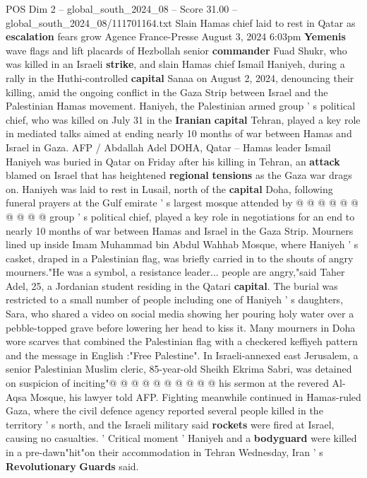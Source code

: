 \begin{textsample}{POS Dim 2 – global\_south\_2024\_08 – Score 31.00 – global\_south\_2024\_08/111701164.txt}  \label{ex:f2_pos_010}
Slain Hamas chief laid to rest in Qatar as \textbf{escalation} fears grow Agence France-Presse August 3, 2024 6:03pm \textbf{Yemenis} wave flags and lift placards of Hezbollah senior \textbf{commander} Fuad Shukr, who was killed in an Israeli \textbf{strike}, and slain Hamas chief Ismail Haniyeh, during a rally in the Huthi-controlled \textbf{capital} Sanaa on August 2, 2024, denouncing their killing, amid the ongoing conflict in the Gaza Strip between Israel and the Palestinian Hamas movement.
Haniyeh, the Palestinian armed group ' s political chief, who was killed on July 31 in the \textbf{Iranian} \textbf{capital} Tehran, played a key role in mediated talks aimed at ending nearly 10 months of war between Hamas and Israel in Gaza.
AFP / Abdallah Adel DOHA, Qatar -- Hamas leader Ismail Haniyeh was buried in Qatar on Friday after his killing in Tehran, an \textbf{attack} blamed on Israel that has heightened \textbf{regional} \textbf{tensions} as the Gaza war drags on.
Haniyeh was laid to rest in Lusail, north of the \textbf{capital} Doha, following funeral prayers at the Gulf emirate ' s largest mosque attended by @ @ @ @ @ @ @ @ @ @ group ' s political chief, played a key role in negotiations for an end to nearly 10 months of war between Hamas and Israel in the Gaza Strip.
Mourners lined up inside Imam Muhammad bin Abdul Wahhab Mosque, where Haniyeh ' s casket, draped in a Palestinian flag, was briefly carried in to the shouts of angry mourners."He was a symbol, a resistance leader... people are angry,"said Taher Adel, 25, a Jordanian student residing in the Qatari \textbf{capital}.
The burial was restricted to a small number of people including one of Haniyeh ' s daughters, Sara, who shared a video on social media showing her pouring holy water over a pebble-topped grave before lowering her head to kiss it.
Many mourners in Doha wore scarves that combined the Palestinian flag with a checkered keffiyeh pattern and the message in English :"Free Palestine".
In Israeli-annexed east Jerusalem, a senior Palestinian Muslim cleric, 85-year-old Sheikh Ekrima Sabri, was detained on suspicion of inciting"@ @ @ @ @ @ @ @ @ @ his sermon at the revered Al-Aqsa Mosque, his lawyer told AFP.
Fighting meanwhile continued in Hamas-ruled Gaza, where the civil defence agency reported several people killed in the territory ' s north, and the Israeli military said \textbf{rockets} were fired at Israel, causing no casualties. ' Critical moment ' Haniyeh and a \textbf{bodyguard} were killed in a pre-dawn"hit"on their accommodation in Tehran Wednesday, Iran ' s \textbf{Revolutionary} \textbf{Guards} said.

\end{textsample}
